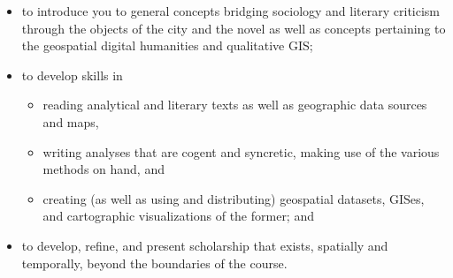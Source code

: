 \begin{itemize}

	\item to introduce you to general concepts bridging sociology and literary
criticism through the objects of the city and the novel as well as concepts
pertaining to the geospatial digital humanities and qualitative GIS;

  \item to develop skills in 

    \begin{itemize}

			\item reading analytical and literary texts as well as geographic data
sources and maps,

			\item writing analyses that are cogent and syncretic, making use of the
various methods on hand, and

			\item creating (as well as using and distributing) geospatial datasets,
GISes, and cartographic visualizations of the former; and

    \end{itemize}

	\item to develop, refine, and present scholarship that exists, spatially and
temporally, beyond the boundaries of the course.

\end{itemize}

